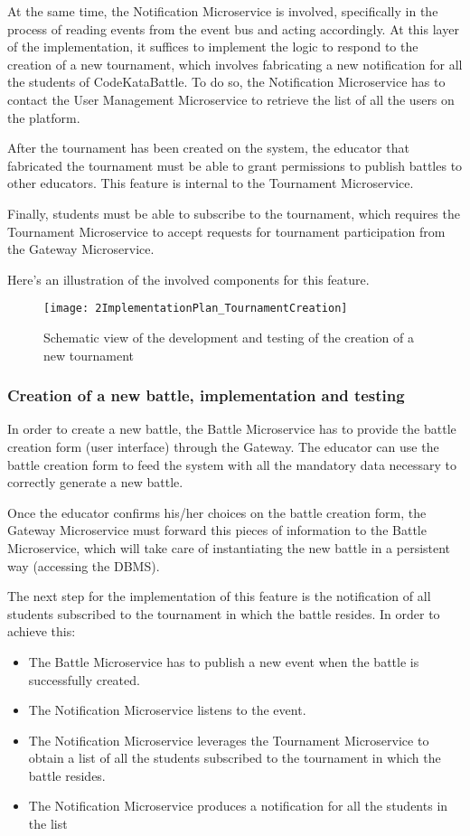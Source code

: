 At the same time, the Notification Microservice is involved, specifically in the process of reading events from the event bus and acting accordingly. At this layer of the implementation, it suffices to implement the logic to respond to the creation of a new tournament, which involves fabricating a new notification for all the students of CodeKataBattle. To do so, the Notification Microservice has to contact the User Management Microservice to retrieve the list of all the users on the platform.

After the tournament has been created on the system, the educator that fabricated the tournament must be able to grant permissions to publish battles to other educators. This feature is internal to the Tournament Microservice.

Finally, students must be able to subscribe to the tournament, which requires the Tournament Microservice to accept requests for tournament participation from the Gateway Microservice.

Here's an illustration of the involved components for this feature.



\begin{figure}[h]
        \centering
	\texttt{[image: 2ImplementationPlan\_TournamentCreation]}
        \caption{Schematic view of the development and testing of the creation of a new tournament}
\end{figure}

\newpage
\subsubsection*{Creation of a new battle, implementation and testing}

In order to create a new battle, the Battle Microservice has to provide the battle creation form (user interface) through the Gateway. The educator can use the battle creation form to feed the system with all the mandatory data necessary to correctly generate a new battle.

Once the educator confirms his/her choices on the battle creation form, the Gateway Microservice must forward this pieces of information to the Battle Microservice, which will take care of instantiating the new battle in a persistent way (accessing the DBMS).

The next step for the implementation of this feature is the notification of all students subscribed to the tournament in which the battle resides. In order to achieve this:
\begin{itemize}
	\item The Battle Microservice has to publish a new event when the battle is successfully created.
	\item The Notification Microservice listens to the event.
	\item The Notification Microservice leverages the Tournament Microservice to obtain a list of all the students subscribed to the tournament in which the battle resides.
	\item The Notification Microservice produces a notification for all the students in the list
\end{itemize}

